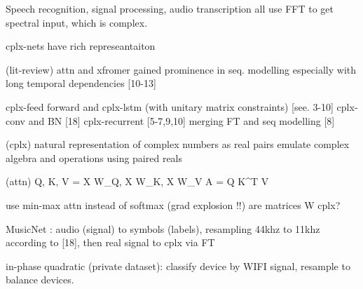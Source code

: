 Speech recognition, signal processing, audio transcription all use FFT to get
spectral input, which is complex.

cplx-nets have rich represeantaiton

(lit-review)
attn and xfromer gained prominence in seq. modelling especially with long
temporal dependencies [10-13]

cplx-feed forward and cplx-lstm (with unitary matrix constraints) [see. 3-10]
cplx-conv and BN [18]
cplx-recurrent [5-7,9,10] merging FT and seq modelling [8]

(cplx)
natural representation of complex numbers as real pairs
emulate complex algebra and operations using paired reals

(attn)
Q, K, V = X W_Q, X W_K, X W_V
A = Q K^T V

use min-max attn instead of softmax (grad explosion !!)
are matrices W cplx?

MusicNet : audio (signal) to symbols (labels), resampling 44khz to 11khz according to
[18], then real signal to cplx via FT

in-phase quadratic (private dataset): classify device by WIFI signal, resample to
balance devices.
